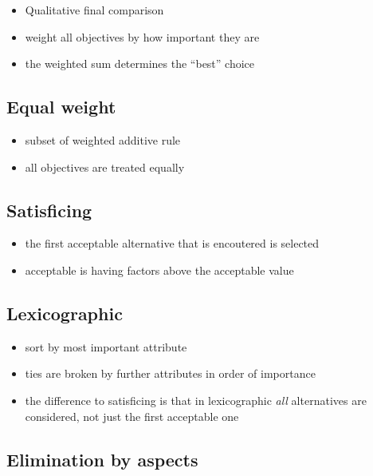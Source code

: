 \begin{itemize}
\tightlist
\item
  Qualitative final comparison
\item
  weight all objectives by how important they are
\item
  the weighted sum determines the ``best'' choice
\end{itemize}

\subsection{Equal weight}\label{equal-weight}

\begin{itemize}
\tightlist
\item
  subset of weighted additive rule
\item
  all objectives are treated equally
\end{itemize}

\subsection{Satisficing}\label{satisficing}

\begin{itemize}
\tightlist
\item
  the first acceptable alternative that is encoutered is selected
\item
  acceptable is having factors above the acceptable value
\end{itemize}

\subsection{Lexicographic}\label{lexicographic}

\begin{itemize}
\tightlist
\item
  sort by most important attribute
\item
  ties are broken by further attributes in order of importance
\item
  the difference to satisficing is that in lexicographic \emph{all}
  alternatives are considered, not just the first acceptable one
\end{itemize}

\subsection{Elimination by aspects}\label{elimination-by-aspects}

